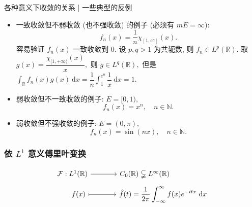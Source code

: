 \begin{frame}{各种意义下收敛的关系 | {\smaller[1] 一些典型的反例}}

\begin{itemize}[<+->]
\item 一致收敛但不弱收敛 (也不强收敛) 的例子 (必须有 $m E = \infty$):
\[f_n(x) = \dfrac{1}{n} \chi_{[1, e^n]}(x).\]
容易验证 $f_n(x)$ 一致收敛到 $0.$ 设 $p, q > 1$ 为共轭数, 则 $f_n \in L^p(\mathbb{R}).$ 取 $\displaystyle g(x) = \dfrac{\chi_{[1, +\infty)}(x)}{x},$ 则 $g \in L^q(\mathbb{R}),$ 但是 $\displaystyle \int_{\mathbb{R}} f_n(x) g(x) ~ \mathrm{d} x = \dfrac{1}{n} \int_{1}^{e^n} \dfrac{1}{x} ~ \mathrm{d} x = 1.$

\item 弱收敛但不一致收敛的例子: $E = [0, 1),$
\[f_n(x) = x^n, \quad n \in \mathbb{N}.\]

\item 弱收敛但不强收敛的例子: $E = (0, \pi),$
\[f_n(x) = \sin(nx), \quad n \in \mathbb{N}.\]
\end{itemize}

\end{frame}


\begin{frame}[fragile]
\frametitle{依 $L^1$ 意义傅里叶变换}

\begin{Def}[依 $L^1$ 意义傅里叶变换]
\[
\begin{tikzcd}[column sep=large, row sep=tiny]
\mathcal{F}: L^1(\mathbb{R}) \arrow[r] & C_0(\mathbb{R}) \subsetneqq L^\infty(\mathbb{R}) \hspace{12ex} \\
\hspace{4ex} f(x) \arrow[mapsto, r] & \hat{f}(t) = {\displaystyle \frac{1}{2\pi} \int_{-\infty}^{\infty} f(x) e^{-itx} ~ \mathrm{d} x}
\end{tikzcd}
\]
\end{Def}

\end{frame}


